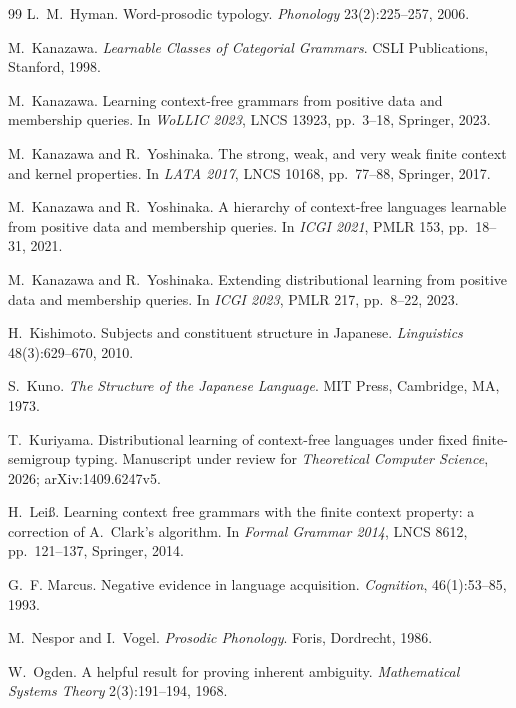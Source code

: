 \documentclass[11pt]{article}
\numberwithin{equation}{section}
\theoremstyle{plain}
\theoremstyle{definition}
\theoremstyle{remark}
\theoremstyle{plain}
\begin{document}
\begin{thebibliography}{99}
L.~M.~Hyman.
Word-prosodic typology.
\textit{Phonology} 23(2):225--257, 2006.

M.~Kanazawa.
\textit{Learnable Classes of Categorial Grammars}.
CSLI Publications, Stanford, 1998.

M.~Kanazawa.
Learning context-free grammars from positive data and membership queries.
In \textit{WoLLIC 2023}, LNCS 13923, pp.~3--18, Springer, 2023.

M.~Kanazawa and R.~Yoshinaka.
The strong, weak, and very weak finite context and kernel properties.
In \textit{LATA 2017}, LNCS 10168, pp.~77--88, Springer, 2017.

M.~Kanazawa and R.~Yoshinaka.
A hierarchy of context-free languages learnable from positive data and
membership queries.
In \textit{ICGI 2021}, PMLR 153, pp.~18--31, 2021.

M.~Kanazawa and R.~Yoshinaka.
Extending distributional learning from positive data and membership
queries.
In \textit{ICGI 2023}, PMLR 217, pp.~8--22, 2023.

H.~Kishimoto.
Subjects and constituent structure in Japanese.
\textit{Linguistics} 48(3):629--670, 2010.

S.~Kuno.
\textit{The Structure of the Japanese Language}.
MIT Press, Cambridge, MA, 1973.

T.~Kuriyama.
Distributional learning of context-free languages under fixed
finite-semigroup typing.
Manuscript under review for \textit{Theoretical Computer Science}, 2026;
arXiv:1409.6247v5.

H.~Lei{\ss}.
Learning context free grammars with the finite context property: a
correction of A.~Clark's algorithm.
In \textit{Formal Grammar 2014}, LNCS 8612, pp.~121--137, Springer, 2014.

G.~F. Marcus.
Negative evidence in language acquisition.
\textit{Cognition}, 46(1):53--85, 1993.

M.~Nespor and I.~Vogel.
\textit{Prosodic Phonology}.
Foris, Dordrecht, 1986.

W.~Ogden.
A helpful result for proving inherent ambiguity.
\textit{Mathematical Systems Theory} 2(3):191--194, 1968.


\end{thebibliography}
\end{document}
